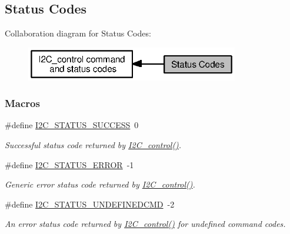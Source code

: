 \subsection{Status Codes}
\label{group___i2_c___s_t_a_t_u_s}
Collaboration diagram for Status Codes\+:
\nopagebreak
\begin{figure}[H]
\begin{center}
\leavevmode
\includegraphics[width=263pt]{group___i2_c___s_t_a_t_u_s}
\end{center}
\end{figure}
\subsubsection*{Macros}
\begin{DoxyCompactItemize}
\item 
\#define \hyperlink{group___i2_c___s_t_a_t_u_s_gaa0bcf3acd26ac82bd8ff91daba2c78c4}{I2\+C\+\_\+\+S\+T\+A\+T\+U\+S\+\_\+\+S\+U\+C\+C\+E\+S\+S}~0
\begin{DoxyCompactList}\small\item\em Successful status code returned by \hyperlink{_i2_c_8h_a633003582213a5098467a4e647cc52f9}{I2\+C\+\_\+control()}. \end{DoxyCompactList}\item 
\#define \hyperlink{group___i2_c___s_t_a_t_u_s_ga7323fe57c39c46d0da9910e17f5f0b06}{I2\+C\+\_\+\+S\+T\+A\+T\+U\+S\+\_\+\+E\+R\+R\+O\+R}~-\/1
\begin{DoxyCompactList}\small\item\em Generic error status code returned by \hyperlink{_i2_c_8h_a633003582213a5098467a4e647cc52f9}{I2\+C\+\_\+control()}. \end{DoxyCompactList}\item 
\#define \hyperlink{group___i2_c___s_t_a_t_u_s_ga11c31c9869ed2441789205d9e5967d66}{I2\+C\+\_\+\+S\+T\+A\+T\+U\+S\+\_\+\+U\+N\+D\+E\+F\+I\+N\+E\+D\+C\+M\+D}~-\/2
\begin{DoxyCompactList}\small\item\em An error status code returned by \hyperlink{_i2_c_8h_a633003582213a5098467a4e647cc52f9}{I2\+C\+\_\+control()} for undefined command codes. \end{DoxyCompactList}\end{DoxyCompactItemize}


